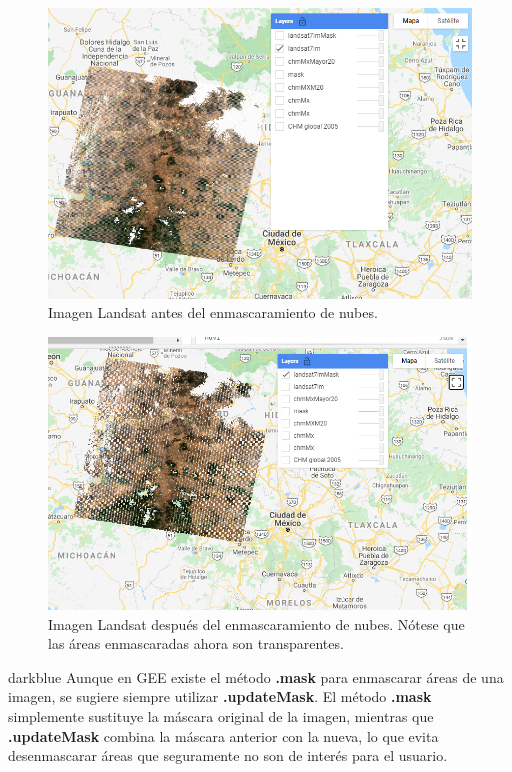 \documentclass[
  12pt,
  letterpaper,
  twoside]{book}
\newcommand\boldpurple[1]{\textcolor{darkpurple}{\textbf{#1}}}
\begin{document}
\begin{figure}[H]

{\centering \includegraphics[width=0.95\linewidth]{Img/ej270} 

}

\caption{Imagen Landsat antes del enmascaramiento de nubes.}\label{fig:unnamed-chunk-78}
\end{figure}

\begin{figure}[H]

{\centering \includegraphics[width=0.95\linewidth]{Img/ej27a} 

}

\caption{Imagen Landsat después del enmascaramiento de nubes. Nótese que las áreas enmascaradas ahora son transparentes.}\label{fig:f98}
\end{figure}


\begin{bluebox2}

\begin{awesomeblock}{5pt}{\faLightbulb}{darkblue}
Aunque en GEE existe el método \boldpurple{.mask} para enmascarar áreas de una imagen, se sugiere siempre utilizar \boldpurple{.updateMask}. El método \boldpurple{.mask} simplemente sustituye la máscara original de la imagen, mientras que \boldpurple{.updateMask} combina la máscara anterior con la nueva, lo que evita desenmascarar áreas que seguramente no son de interés para el usuario.

\end{awesomeblock}

\end{bluebox2}
\end{document}
